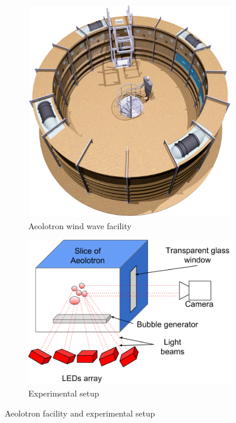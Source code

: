 		\begin{figure}
			\centering
			\begin{subfigure}[t]{.4\linewidth}
				\centering
				\includegraphics[scale=0.15]{images/aeolotron-gesamt.png}
				\caption{Aeolotron wind wave facility \citep{Krall2013}}
			\end{subfigure}
			\begin{subfigure}[t]{.4\linewidth}		
				\centering
				\includegraphics[scale=.5]{images/aeolotron_setup.png}
				\caption{Experimental setup}
			\end{subfigure}
			
			\caption{Aeolotron facility and experimental setup}
			\label{fig:aeolotron_setup}
		\end{figure}
	
